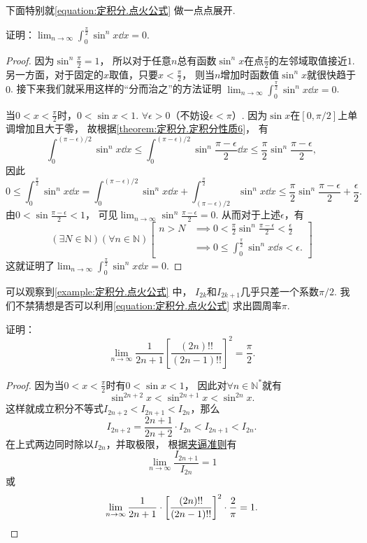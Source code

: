 下面特别就\cref{equation:定积分.点火公式} 做一点点展开.
\begin{example}
证明：\(\lim_{n\to\infty} \int_0^{\frac\pi2} \sin^n x \dd{x} = 0\).
\begin{proof}
因为\(\sin^n\frac{\pi}{2}=1\)，
所以对于任意\(n\)总有函数\(\sin^n x\)在点\(\frac{\pi}{2}\)的左邻域取值接近\(1\).
另一方面，对于固定的\(x\)取值，只要\(x<\frac{\pi}{2}\)，
则当\(n\)增加时函数值\(\sin^n x\)就很快趋于\(0\).
接下来我们就采用这样的“分而治之”的方法证明
\(\lim_{n\to\infty} \int_0^{\frac\pi2} \sin^n x \dd{x} = 0\).

当\(0<x<\frac{\pi}{2}\)时，\(0<\sin x<1\).
\(\forall\epsilon>0\)（不妨设\(\epsilon<\pi\)）.
因为\(\sin x\)在\([0,\pi/2]\)上单调增加且大于零，
故根据\cref{theorem:定积分.定积分性质6}，
有\[
	\int_0^{(\pi-\epsilon)/2} \sin^n x \dd{x}
	\leq
	\int_0^{(\pi-\epsilon)/2} \sin^n\frac{\pi-\epsilon}{2} \dd{x}
	\leq
	\frac{\pi}{2} \sin^n\frac{\pi-\epsilon}{2},
\]
因此\[
	0 \leq \int_0^{\frac\pi2} \sin^n x \dd{x}
	= \int_0^{(\pi-\epsilon)/2} \sin^n x \dd{x}
	+ \int_{(\pi-\epsilon)/2}^{\frac\pi2} \sin^n x \dd{x}
	\leq \frac{\pi}{2} \sin^n\frac{\pi-\epsilon}{2} + \frac{\epsilon}{2}.
\]
由\(0<\sin\frac{\pi-\epsilon}{2}<1\)，
可见\(\lim_{n\to\infty} \sin^n\frac{\pi-\epsilon}{2} = 0\).
从而对于上述\(\epsilon\)，有\[
	(\exists N\in\mathbb{N})
	(\forall n\in\mathbb{N})
	\left[
		\begin{array}{ll}
			n>N
			&\implies
			0<\frac{\pi}{2} \sin^n\frac{\pi-\epsilon}{2}<\frac{\epsilon}{2} \\
			&\implies
			0 \leq \int_0^{\frac\pi2} \sin^n x \dd{s} < \epsilon.
		\end{array}
	\right]
\]
这就证明了\(\lim_{n\to\infty} \int_0^{\frac\pi2} \sin^n x \dd{x} = 0\).
\end{proof}
\end{example}

可以观察到\cref{example:定积分.点火公式} 中，
\(I_{2k}\)和\(I_{2k+1}\)几乎只差一个系数\(\pi/2\).
我们不禁猜想是否可以利用\cref{equation:定积分.点火公式} 求出圆周率\(\pi\).
\begin{example}[沃利斯公式]
证明：\begin{equation}\label{equation:定积分.沃利斯公式}
	\lim_{n\to\infty} \frac{1}{2n+1} \left[
		\frac{(2n)!!}{(2n-1)!!}
	\right]^2
	= \frac{\pi}{2}.
\end{equation}
\begin{proof}
因为当\(0<x<\frac{\pi}{2}\)时有\(0<\sin x<1\)，
因此对\(\forall n\in\mathbb{N}^*\)就有\[
	\sin^{2n+2} x < \sin^{2n+1} x < \sin^{2n} x.
\]
这样就成立积分不等式\(I_{2n+2} < I_{2n+1} < I_{2n}\)，那么\[
	I_{2n+2} = \frac{2n+1}{2n+2} \cdot I_{2n}
	< I_{2n+1} < I_{2n}.
\]
在上式两边同时除以\(I_{2n}\)，并取极限，
根据\hyperref[theorem:极限.夹逼准则]{夹逼准则}有\[
	\lim_{n\to\infty} \frac{I_{2n+1}}{I_{2n}} = 1
\]
或\[
	\lim_{n\to\infty} \frac{1}{2n+1} \cdot \left[
		\frac{(2n)!!}{(2n-1)!!}
	\right]^2 \cdot \frac{2}{\pi}
	= 1.
	\qedhere
\]
\end{proof}
\end{example}

